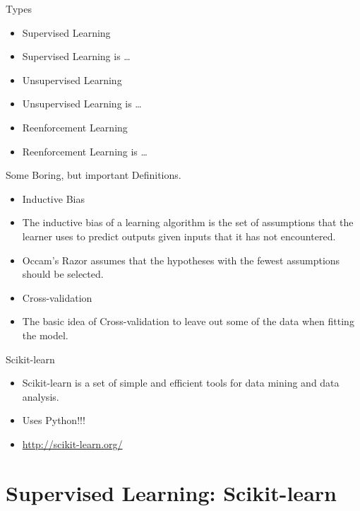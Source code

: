 \begin{frame}{Types}

\begin{itemize}
\itemsep1pt\parskip0pt
\item
  Supervised Learning
\item
  Supervised Learning is \ldots{}
\item
  Unsupervised Learning
\item
  Unsupervised Learning is \ldots{}
\item
  Reenforcement Learning
\item
  Reenforcement Learning is \ldots{}
\end{itemize}

\end{frame}

\begin{frame}{Some Boring, but important Definitions.}

\begin{itemize}
\itemsep1pt\parskip0pt
\item
  Inductive Bias
\item
  The inductive bias of a learning algorithm is the set of assumptions
  that the learner uses to predict outputs given inputs that it has not
  encountered.
\item
  Occam's Razor assumes that the hypotheses with the fewest assumptions
  should be selected.
\item
  Cross-validation
\item
  The basic idea of Cross-validation to leave out some of the data when
  fitting the model.
\end{itemize}

\end{frame}

\begin{frame}{Scikit-learn}

\begin{itemize}
\itemsep1pt\parskip0pt
\item
  Scikit-learn is a set of simple and efficient tools for data mining
  and data analysis.
\item
  Uses Python!!!
\item
  \url{http://scikit-learn.org/}
\end{itemize}

\end{frame}

\section{Supervised Learning:
Scikit-learn}\label{supervised-learning-scikit-learn}

